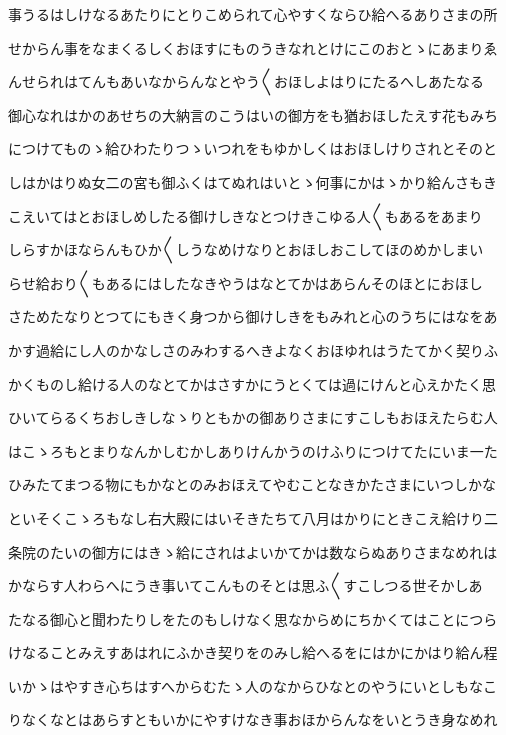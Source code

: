 \documentclass[a4paper,11pt,landscape]{ltjtarticle}
\begin{document}
事うるはしけなるあたりにとりこめられて心やすくならひ給へるありさまの所
\par\medskip
せからん事をなまくるしくおほすにものうきなれとけにこのおとゝにあまりゑ
\par\medskip
んせられはてんもあいなからんなとやう〱おほしよはりにたるへしあたなる
\par\medskip
御心なれはかのあせちの大納言のこうはいの御方をも猶おほしたえす花もみち
\par\medskip
につけてものゝ給ひわたりつゝいつれをもゆかしくはおほしけりされとそのと
\par\medskip
しはかはりぬ女二の宮も御ふくはてぬれはいとゝ何事にかはゝかり給んさもき
\par\medskip
こえいてはとおほしめしたる御けしきなとつけきこゆる人〱もあるをあまり
\par\medskip
しらすかほならんもひか〱しうなめけなりとおほしおこしてほのめかしまい
\par\medskip
らせ給おり〱もあるにはしたなきやうはなとてかはあらんそのほとにおほし
\par\medskip
さためたなりとつてにもきく身つから御けしきをもみれと心のうちにはなをあ
\par\medskip
かす過給にし人のかなしさのみわするへきよなくおほゆれはうたてかく契りふ
\par\medskip
かくものし給ける人のなとてかはさすかにうとくては過にけんと心えかたく思
\par\medskip
ひいてらるくちおしきしなゝりともかの御ありさまにすこしもおほえたらむ人
\par\medskip
はこゝろもとまりなんかしむかしありけんかうのけふりにつけてたにいま一た
\par\medskip
ひみたてまつる物にもかなとのみおほえてやむことなきかたさまにいつしかな
\par\medskip
といそくこゝろもなし右大殿にはいそきたちて八月はかりにときこえ給けり二
\par\medskip
条院のたいの御方にはきゝ給にされはよいかてかは数ならぬありさまなめれは
\par\medskip
かならす人わらへにうき事いてこんものそとは思ふ〱すこしつる世そかしあ
\par\medskip
たなる御心と聞わたりしをたのもしけなく思なからめにちかくてはことにつら
\par\medskip
けなることみえすあはれにふかき契りをのみし給へるをにはかにかはり給ん程
\par\medskip
いかゝはやすき心ちはすへからむたゝ人のなからひなとのやうにいとしもなこ
\par\medskip
りなくなとはあらすともいかにやすけなき事おほからんなをいとうき身なめれ
\end{document}

